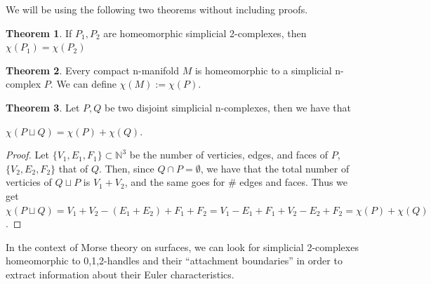 \documentclass[12pt]{article}
\newcommand{\bN}{{\mathbb N}}
\theoremstyle{definition}
\newtheorem{theorem}{Theorem}
\begin{document}
We will be using the following two theorems without including proofs.

\begin{theorem}
      If $P_1, P_2$ are homeomorphic simplicial 2-complexes, then $\chi(P_1) = \chi(P_2)$
\end{theorem}

\begin{theorem}
      Every compact n-manifold $M$ is homeomorphic to a simplicial n-complex $P$. We can define $\chi(M) := \chi(P)$. 
\end{theorem}

\begin{theorem}
      Let $P,Q$ be two disjoint simplicial n-complexes, then we have that 
      \begin{center}
            $\chi(P\sqcup Q) = \chi(P) + \chi(Q)$. 
      \end{center}
\end{theorem}

\begin{proof}
      Let $\{V_1,E_1,F_1\} \subset \bN^3$ be the number of verticies, edges, and faces of $P$, $\{V_2,E_2,F_2\}$ that of $Q$. Then, since $Q \cap P = \emptyset$, we have that the total number of verticies of $Q\sqcup P$ is $V_1+V_2$, and the same goes for $\#$ edges and faces. Thus we get $\chi(P\sqcup Q) = V_1 +V_2 -(E_1+E_2)+F_1+F_2 = V_1-E_1+F_1 + V_2-E_2+F_2 = \chi(P) +\chi(Q)$. 
\end{proof}

\noindent
In the context of Morse theory on surfaces, we can look for simplicial 2-complexes homeomorphic to 0,1,2-handles and their ``attachment boundaries'' in order to extract information about their Euler characteristics. 
\end{document}
